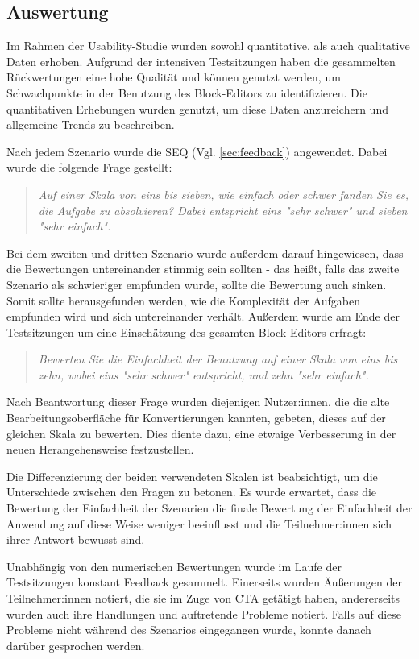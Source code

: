 \subsection{Auswertung}
Im Rahmen der Usability-Studie wurden sowohl quantitative, als auch qualitative Daten erhoben. Aufgrund der intensiven Testsitzungen haben die gesammelten Rückwertungen eine hohe Qualität und können genutzt werden, um Schwachpunkte in der Benutzung des Block-Editors zu identifizieren. Die quantitativen Erhebungen wurden genutzt, um diese Daten anzureichern und allgemeine Trends zu beschreiben.

Nach jedem Szenario wurde die \ac{SEQ} (Vgl. \ref{sec:feedback}) angewendet. Dabei wurde die folgende Frage gestellt:
\begin{quote}
  \textit{
    Auf einer Skala von eins bis sieben, wie einfach oder schwer fanden Sie es, die Aufgabe zu absolvieren? Dabei entspricht eins "sehr schwer" und sieben "sehr einfach".}
\end{quote}
Bei dem zweiten und dritten Szenario wurde außerdem darauf hingewiesen, dass die Bewertungen untereinander stimmig sein sollten - das heißt, falls das zweite Szenario als schwieriger empfunden wurde, sollte die Bewertung auch sinken. Somit sollte herausgefunden werden, wie die Komplexität der Aufgaben empfunden wird und sich untereinander verhält. Außerdem wurde am Ende der Testsitzungen um eine Einschätzung des gesamten Block-Editors erfragt:
\begin{quote}
  \textit{
    Bewerten Sie die Einfachheit der Benutzung auf einer Skala von eins bis zehn, wobei eins "sehr schwer" entspricht, und zehn "sehr einfach".
  }
\end{quote}
Nach Beantwortung dieser Frage wurden diejenigen Nutzer:innen, die die alte Bearbeitungsoberfläche für Konvertierungen kannten, gebeten, dieses auf der gleichen Skala zu bewerten. Dies diente dazu, eine etwaige Verbesserung in der neuen Herangehensweise festzustellen.

Die Differenzierung der beiden verwendeten Skalen ist beabsichtigt, um die Unterschiede zwischen den Fragen zu betonen. Es wurde erwartet, dass die Bewertung der Einfachheit der Szenarien die finale Bewertung der Einfachheit der Anwendung auf diese Weise weniger beeinflusst und die Teilnehmer:innen sich ihrer Antwort bewusst sind.

Unabhängig von den numerischen Bewertungen wurde im Laufe der Testsitzungen konstant Feedback gesammelt. Einerseits wurden Äußerungen der Teilnehmer:innen notiert, die sie im Zuge von \ac{CTA} getätigt haben, andererseits wurden auch ihre Handlungen und auftretende Probleme notiert. Falls auf diese Probleme nicht während des Szenarios eingegangen wurde, konnte danach darüber gesprochen werden.

